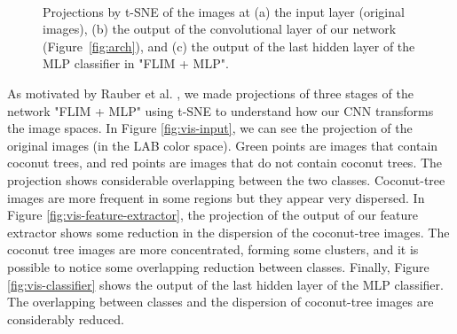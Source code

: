 \documentclass[a4paper,conference]{IEEEtran}
\begin{document}
\begin{figure}
  \centering
  ~
  ~
  \caption{Projections by t-SNE of the images at (a) the input layer (original images), (b) the output of the convolutional layer of our network (Figure~\ref{fig:arch}), and (c) the output of the last hidden layer of the MLP classifier in "FLIM + MLP".}
\end{figure}

As motivated by Rauber et al. \cite{rauber2016visualizing}, we made projections of three stages of the network "FLIM + MLP" using t-SNE \cite{maaten2008visualizing} to understand how our CNN transforms the image spaces. In Figure \ref{fig:vis-input}, we can see the projection of the original images (in the LAB color space). Green points are images that contain coconut trees, and red points are images that do not contain coconut trees. The projection shows considerable overlapping between the two classes. Coconut-tree images are more frequent in some regions but they appear very dispersed. In Figure \ref{fig:vis-feature-extractor}, the projection of the output of our feature extractor shows some reduction in the dispersion of the coconut-tree images. The coconut tree images are more concentrated, forming some clusters, and it is possible to notice some overlapping reduction between classes. Finally, Figure \ref{fig:vis-classifier} shows the output of the last hidden layer of the MLP classifier. The overlapping between classes and the dispersion of coconut-tree images are considerably reduced. 
\end{document}
